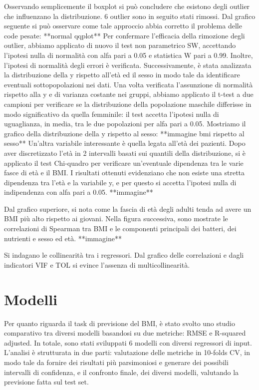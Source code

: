 Osservando semplicemente il boxplot si può concludere che esistono degli outlier che influenzano la distribuzione. 6 outlier sono in seguito stati rimossi. Dal grafico seguente si può osservare come tale approccio abbia corretto il problema delle code pesate:
**normal qqplot**
Per confermare l'efficacia della rimozione degli outlier, abbiamo applicato di nuovo il test non parametrico SW, accettando l’ipotesi nulla di normalità con alfa pari a 0.05 e statistica W pari a 0.99. Inoltre, l’ipotesi di normalità degli errori è verificata.
Successivamente, è stata analizzata la distribuzione della y rispetto all’età ed il sesso in modo tale da identificare eventuali sottopopolazioni nei dati. Una volta verificata l’assunzione di normalità rispetto alla y e di varianza costante nei gruppi, abbiamo applicato il t-test a due campioni per verificare se la distribuzione della popolazione maschile differisse in modo significativo da quella femminile: il test accetta l’ipotesi nulla di uguaglianza, in media, tra le due popolazioni per alfa pari a 0.05. Mostriamo il grafico della distribuzione della y rispetto al sesso: 
**immagine bmi rispetto al sesso**
Un’altra variabile interessante è quella legata all’età dei pazienti. Dopo aver discretizzato l’età in 2 intervalli basati sui quantili della distribuzione, si è applicato il test Chi-quadro per verificare un'eventuale dipendenza tra le varie fasce di età e il BMI. I risultati ottenuti evidenziano che non esiste una stretta dipendenza tra l’età e la variabile y, e per questo si accetta l’ipotesi nulla di indipendenza con alfa pari a 0.05.
**immagine**

Dal grafico superiore, si nota come la fascia di età degli adulti tenda ad avere un BMI più alto rispetto ai giovani. Nella figura successiva, sono mostrate le correlazioni di Spearman tra BMI e le componenti principali dei batteri, dei nutrienti e sesso ed età. 
**immagine**

Si indagano le collinearità tra i regressori. Dal grafico delle correlazioni e dagli indicatori VIF e TOL si evince l'assenza di multicollinearità.


\section{Modelli}
 Per quanto riguarda il task di previsione del BMI, è stato svolto uno studio comparativo tra diversi modelli basandosi su due metriche: RMSE e R-squared adjusted. In totale, sono stati sviluppati 6 modelli con diversi regressori di input. L’analisi è strutturata in due parti: valutazione delle metriche in 10-folds CV, in modo tale da fornire dei risultati più parsimoniosi e generare dei possibili intervalli di confidenza, e il confronto finale, dei diversi modelli, valutando la previsione fatta sul test set. 
